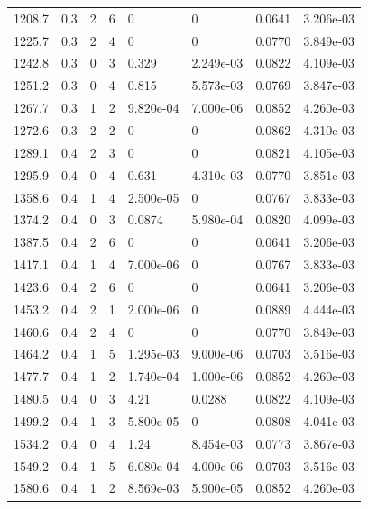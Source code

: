\documentclass[preview]{standalone}
\begin{document}
{{{\begin{tabular}{L{1.2cm}C{1.2cm} C{0.3cm}C{0.5cm} C{1.4cm}C{1.4cm} C{1.4cm}C{1.4cm}}
  1208.7  &   0.3  & 2     &  6 &  0  & 0  & 0.0641 &  3.206e-03   \\ 
  1225.7  &   0.3  & 2     &  4 &  0  & 0  & 0.0770 &  3.849e-03   \\ 
  1242.8  &   0.3  & 0     &  3 &  0.329  & 2.249e-03  & 0.0822 &  4.109e-03   \\ 
  1251.2  &   0.3  & 0     &  4 &  0.815  & 5.573e-03  & 0.0769 &  3.847e-03   \\ 
  1267.7  &   0.3  & 1     &  2 &  9.820e-04  & 7.000e-06  & 0.0852 &  4.260e-03   \\ 
  1272.6  &   0.3  & 2     &  2 &  0  & 0  & 0.0862 &  4.310e-03   \\ 
  1289.1  &   0.4  & 2     &  3 &  0  & 0  & 0.0821 &  4.105e-03   \\ 
  1295.9  &   0.4  & 0     &  4 &  0.631  & 4.310e-03  & 0.0770 &  3.851e-03   \\ 
  1358.6  &   0.4  & 1     &  4 &  2.500e-05  & 0  & 0.0767 &  3.833e-03   \\ 
  1374.2  &   0.4  & 0     &  3 &  0.0874  & 5.980e-04  & 0.0820 &  4.099e-03   \\ 
  1387.5  &   0.4  & 2     &  6 &  0  & 0  & 0.0641 &  3.206e-03   \\ 
  1417.1  &   0.4  & 1     &  4 &  7.000e-06  & 0  & 0.0767 &  3.833e-03   \\ 
  1423.6  &   0.4  & 2     &  6 &  0  & 0  & 0.0641 &  3.206e-03   \\ 
  1453.2  &   0.4  & 2     &  1 &  2.000e-06  & 0  & 0.0889 &  4.444e-03   \\ 
  1460.6  &   0.4  & 2     &  4 &  0  & 0  & 0.0770 &  3.849e-03   \\ 
  1464.2  &   0.4  & 1     &  5 &  1.295e-03  & 9.000e-06  & 0.0703 &  3.516e-03   \\ 
  1477.7  &   0.4  & 1     &  2 &  1.740e-04  & 1.000e-06  & 0.0852 &  4.260e-03   \\ 
  1480.5  &   0.4  & 0     &  3 &  4.21  & 0.0288  & 0.0822 &  4.109e-03   \\ 
  1499.2  &   0.4  & 1     &  3 &  5.800e-05  & 0  & 0.0808 &  4.041e-03   \\ 
  1534.2  &   0.4  & 0     &  4 &  1.24  & 8.454e-03  & 0.0773 &  3.867e-03   \\ 
  1549.2  &   0.4  & 1     &  5 &  6.080e-04  & 4.000e-06  & 0.0703 &  3.516e-03   \\ 
  1580.6  &   0.4  & 1     &  2 &  8.569e-03  & 5.900e-05  & 0.0852 &  4.260e-03   \\ 

\end{tabular}}}}
\end{document}
